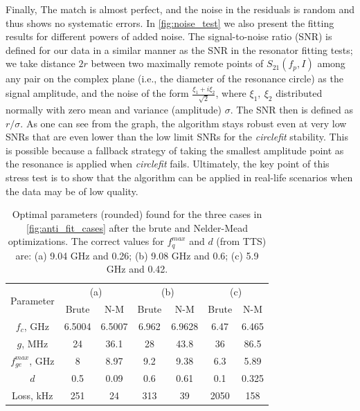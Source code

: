\documentclass[%
 aip,
 draft,
 amsmath,amssymb,
 reprint,%
]{revtex4-1}
\begin{document}
Finally, The match is almost perfect, and the noise in the residuals is random and thus shows no systematic errors. In \autoref{fig:noise_test} we also present the fitting results for different powers of added noise. The signal-to-noise ratio (SNR) is defined for our data in a similar manner as the SNR in the resonator fitting tests\cite{probst2015}; we take distance $2r$ between two maximally remote points of $S_{21}(f_p, I)$ among any pair on the complex plane (i.e., the diameter of the resonance circle) as the signal amplitude, and the noise of the form $\frac{\xi_1+i\xi_2}{\sqrt 2}$, where $\xi_1,\ \xi_2$ distributed normally with zero mean and variance (amplitude) $\sigma$. The SNR then is defined as $r/\sigma$. As one can see from the graph, the algorithm stays robust even at very low SNRs that are even lower than the low limit SNRs for the \textit{circlefit} stability. This is possible because a fallback strategy of taking the smallest amplitude point as the resonance is applied when \textit{circlefit} fails. Ultimately, the key point of this stress test is to show that the algorithm can be applied in real-life scenarios when the data may be of low quality.
\begin{table}[b]
	\centering
	\begin{ruledtabular}
		\begin{tabular}{c|cc|cc|cc} 
			\multirow{2}{*}{Parameter} & 
			\multicolumn{2}{c}{(a)} & 
			\multicolumn{2}{c}{(b)} & \multicolumn{2}{c}{(c)}\\
			& Brute & N-M & Brute & N-M & Brute& N-M\\
			\hline
			$f_c$, GHz &6.5004 & 6.5007 & 6.962 & 6.9628 &  6.47 & 6.465\\ 
			$g$, MHz & 24 & 36.1 & 28 & 43.8 & 36 & 86.5\\
			$f_{ge}^{max}$, GHz & 8 &8.97 &9.2& 9.38& 6.3& 5.89\\
			$d$ &0.5&0.09&0.6&0.61&0.1& 0.325 \\\hline
			Loss, kHz & 251 & 24 &313& 39 &2050& 158
		\end{tabular} 
	\end{ruledtabular}
	\caption{Optimal parameters (rounded) found for the three cases in \autoref{fig:anti_fit_cases} after the brute and Nelder-Mead optimizations. The correct values for $f_q^{max}$ and $d$ (from TTS) are: (a) 9.04 GHz and 0.26; (b) 9.08 GHz and 0.6; (c) 5.9 GHz and 0.42.}
	\label{tab:sts_results}
\end{table}
\end{document}
